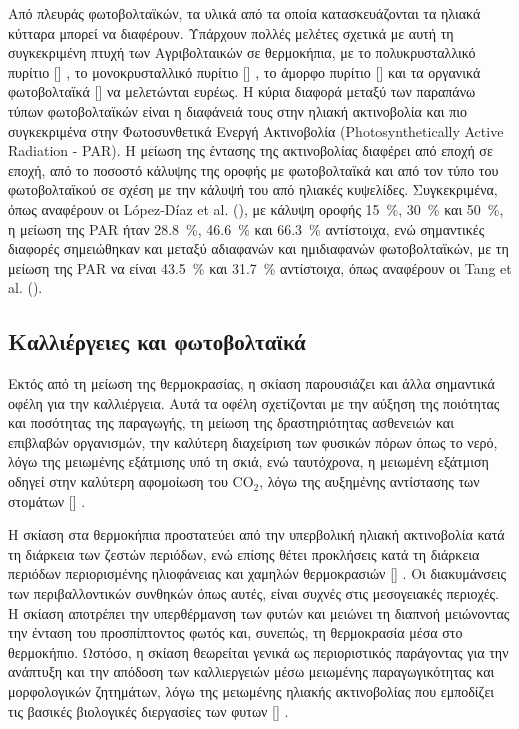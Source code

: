 \documentclass[12pt, a4paper]{report} %
\DeclareRobustCommand{\lcitep}[1]{%
  \english{[\cite{#1}]}%
}
\newcommand{\english}{\foreignlanguage{english}}
\begin{document}
Από πλευράς φωτοβολταϊκών, τα υλικά από τα οποία κατασκευάζονται τα ηλιακά κύτταρα μπορεί να διαφέρουν. Υπάρχουν πολλές 
μελέτες σχετικά με αυτή τη συγκεκριμένη πτυχή των Αγριβολταικών σε θερμοκήπια, με το πολυκρυσταλλικό πυρίτιο 
\lcitep{eisagwgi_alg_bib31,eisagwgi_alg_bib30}, το μονοκρυσταλλικό πυρίτιο \lcitep{eisagwgi_adv_alg_bib14}, 
το άμορφο πυρίτιο \lcitep{eisagwgi_adv_alg_bib15} και τα οργανικά φωτοβολταϊκά \lcitep{eisagwgi_adv_alg_bib16} να 
μελετώνται ευρέως. Η κύρια διαφορά μεταξύ των παραπάνω τύπων φωτοβολταϊκών είναι η διαφάνειά τους στην ηλιακή 
ακτινοβολία και πιο συγκεκριμένα στην Φωτοσυνθετικά Ενεργή Ακτινοβολία 
(\english{Photosynthetically Active Radiation - PAR}). Η μείωση της έντασης της ακτινοβολίας διαφέρει από εποχή σε 
εποχή, από το ποσοστό κάλυψης της οροφής με φωτοβολταϊκά και από τον τύπο του φωτοβολταϊκού σε σχέση με την κάλυψή 
του από ηλιακές κυψελίδες. Συγκεκριμένα, όπως αναφέρουν οι \english{López-Díaz et al.} (\citeyear{eisagwgi_alg_bib31}), 
με κάλυψη οροφής \SI{15}{\percent}, \SI{30}{\percent} και \SI{50}{\percent}, η μείωση της \english{PAR} ήταν 
\SI{28.8}{\percent}, \SI{46.6}{\percent} και \SI{66.3}{\percent} αντίστοιχα, ενώ σημαντικές διαφορές σημειώθηκαν και 
μεταξύ αδιαφανών και ημιδιαφανών φωτοβολταϊκών, με τη μείωση της \english{PAR} να είναι \SI{43.5}{\percent} και 
\SI{31.7}{\percent} αντίστοιχα, όπως αναφέρουν οι \english{Tang et al.} (\citeyear{eisagwgi_adv_alg_bib15}).

\subsection{Καλλιέργειες και φωτοβολταϊκά}\label{sub_crops_agrivolt}

Εκτός από τη μείωση της θερμοκρασίας, η σκίαση παρουσιάζει και άλλα σημαντικά οφέλη για την καλλιέργεια. Αυτά τα οφέλη 
σχετίζονται με την αύξηση της ποιότητας και ποσότητας της παραγωγής, τη μείωση της δραστηριότητας ασθενειών και 
επιβλαβών οργανισμών, την καλύτερη διαχείριση των φυσικών πόρων όπως το νερό, λόγω της μειωμένης εξάτμισης υπό τη 
σκιά, ενώ ταυτόχρονα, η μειωμένη εξάτμιση οδηγεί στην καλύτερη αφομοίωση του \english{CO$_2$}, λόγω της αυξημένης 
αντίστασης των στομάτων \lcitep{eisagwgi_alg_bib14}.

Η σκίαση στα θερμοκήπια προστατεύει από την υπερβολική ηλιακή ακτινοβολία κατά τη διάρκεια των ζεστών περιόδων, 
ενώ επίσης θέτει προκλήσεις κατά τη διάρκεια περιόδων περιορισμένης ηλιοφάνειας και χαμηλών θερμοκρασιών 
\lcitep{eisagwgi_str_bib34}. Οι διακυμάνσεις των περιβαλλοντικών συνθηκών όπως αυτές, είναι συχνές στις μεσογειακές 
περιοχές. Η σκίαση αποτρέπει την υπερθέρμανση των φυτών και μειώνει τη διαπνοή μειώνοντας την ένταση του προσπίπτοντος 
φωτός και, συνεπώς, τη θερμοκρασία μέσα στο θερμοκήπιο. Ωστόσο, η σκίαση θεωρείται γενικά ως περιοριστικός παράγοντας 
για την ανάπτυξη και την απόδοση των καλλιεργειών μέσω μειωμένης παραγωγικότητας και μορφολογικών ζητημάτων, λόγω της 
μειωμένης ηλιακής ακτινοβολίας που εμποδίζει τις βασικές βιολογικές διεργασίες των φυτων 
\lcitep{eisagwgi_str_bib35,eisagwgi_str_bib36,eisagwgi_adv_alg_bib20,eisagwgi_adv_alg_bib21}.
\end{document}
